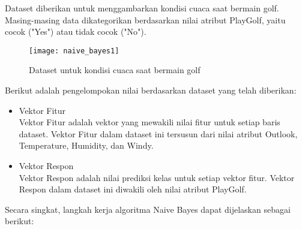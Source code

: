 \vspace{0.3cm}

\noindent Dataset diberikan untuk menggambarkan kondisi cuaca saat bermain golf. Masing-masing data dikategorikan berdasarkan nilai atribut PlayGolf, yaitu cocok ("Yes") atau tidak cocok ("No"). 

\begin{figure}[H]
	\centering
	\texttt{[image: naive\_bayes1]}
	\caption{Dataset untuk kondisi cuaca saat bermain golf}
	\label{fig:naive_bayes1}
\end{figure}

\noindent Berikut adalah pengelompokan nilai berdasarkan dataset yang telah diberikan:

\begin{itemize}

\item 
Vektor Fitur\\
Vektor Fitur adalah vektor yang mewakili nilai fitur untuk setiap baris dataset. Vektor Fitur dalam dataset ini tersusun dari nilai atribut Outlook, Temperature, Humidity, dan Windy.

\item
Vektor Respon\\
Vektor Respon adalah nilai prediksi kelas untuk setiap vektor fitur. Vektor Respon dalam dataset ini diwakili oleh nilai atribut PlayGolf.

\end{itemize}


\noindent Secara singkat, langkah kerja algoritma Naive Bayes dapat dijelaskan sebagai berikut:


